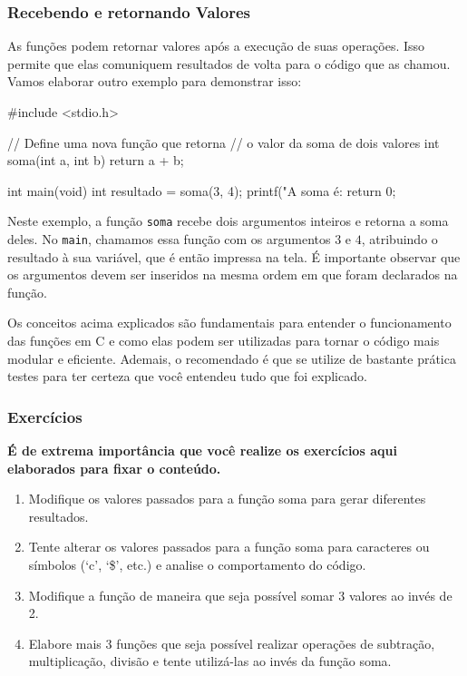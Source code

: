 \subsubsection{Recebendo e retornando Valores}

As funções podem retornar valores após a execução de suas operações. Isso 
permite que elas comuniquem resultados de volta para o código que as 
chamou. Vamos elaborar outro exemplo para demonstrar isso:

\begin{excode}
    #include <stdio.h>

    // Define uma nova função que retorna 
    // o valor da soma de dois valores
    int soma(int a, int b) 
    {
        return a + b;
    }

    int main(void)
    {
        int resultado = soma(3, 4);
        printf("A soma é: %
        return 0;
    }
\end{excode}

Neste exemplo, a função \texttt{soma} recebe dois argumentos inteiros e 
retorna a soma deles. No \texttt{main}, chamamos essa função com os 
argumentos \(3\) e \(4\), atribuindo o resultado à sua variável, 
que é então impressa na tela. É importante observar que os argumentos devem 
ser inseridos na mesma ordem em que foram declarados na função.

Os conceitos acima explicados são fundamentais para entender o funcionamento 
das funções em C e como elas podem ser utilizadas para tornar o código mais 
modular e eficiente. Ademais, o recomendado é que se utilize de bastante 
prática testes para ter certeza que você entendeu tudo que foi explicado.

\subsubsection{Exercícios}

\textbf{É de extrema importância que você realize os exercícios aqui elaborados para fixar o 
conteúdo.}

\begin{enumerate}
    \item{Modifique os valores passados para a função soma para gerar 
        diferentes resultados.}
    \item{Tente alterar os valores passados para a função soma para caracteres 
        ou símbolos (`c', `\$', etc.) e analise o comportamento do código.}
    \item{Modifique a função de maneira que seja possível somar 3 valores ao 
        invés de 2.}
    \item{Elabore mais 3 funções que seja possível realizar operações de 
        subtração, multiplicação, divisão e tente utilizá-las ao invés da 
        função soma.}
\end{enumerate}
